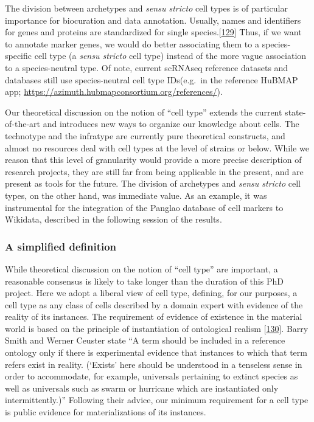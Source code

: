 The division between archetypes and \emph{sensu stricto} cell types is of particular importance for biocuration and data annotation.
Usually, names and identifiers for genes and proteins are standardized for single species.{[}\protect\hyperlink{ref-baJRsCMu}{129}{]}
Thus, if we want to annotate marker genes, we would do better associating them to a species-specific cell type (a \emph{sensu stricto} cell type) instead of the more vague association to a species-neutral type.
Of note, current scRNAseq reference datasets and databases still use species-neutral cell type IDs(e.g.~in the reference HuBMAP app; \url{https://azimuth.hubmapconsortium.org/references/}).

Our theoretical discussion on the notion of ``cell type'' extends the current state-of-the-art and introduces new ways to organize our knowledge about cells.
The technotype and the infratype are currently pure theoretical constructs, and almost no resources deal with cell types at the level of strains or below.
While we reason that this level of granularity would provide a more precise description of research projects, they are still far from being applicable in the present, and are present as tools for the future.
The division of archetypes and \emph{sensu stricto} cell types, on the other hand, was immediate value.
As an example, it was instrumental for the integration of the Panglao database of cell markers to Wikidata, described in the following session of the results.

\hypertarget{a-simplified-definition}{%
\subsubsection{A simplified definition}\label{a-simplified-definition}}

While theoretical discussion on the notion of ``cell type'' are important, a reasonable consensus is likely to take longer than the duration of this PhD project.
Here we adopt a liberal view of cell type, defining, for our purposes, a cell type as any class of cells described by a domain expert with evidence of the reality of its instances.
The requirement of evidence of existence in the material world is based on the principle of instantiation of ontological realism {[}\protect\hyperlink{ref-5ZFRyTy5}{130}{]}. Barry Smith and Werner Ceuster state ``A term should be included in a reference ontology only if there is experimental evidence that instances to which that term refers exist in reality. (`Exists' here should be understood in a tenseless sense in order to accommodate, for example, universals pertaining to extinct species as well as universals such as swarm or hurricane which are instantiated only intermittently.)''
Following their advice, our minimum requirement for a cell type is public evidence for materializations of its instances.

